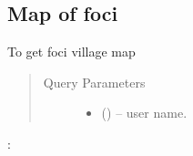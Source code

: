 \documentclass[letterpaper,10pt,english,openany,oneside]{sphinxmanual}
\begin{document}
\subsection{Map of foci}
\label{\detokenize{api-cmi/v1:map-of-foci}}

\begin{fulllineitems}
\label{\detokenize{api-cmi/v1:post--api-malaria-info-v1-Foci-list}}
\sphinxAtStartPar
To get foci village map
\begin{quote}\begin{description}
\item[{Query Parameters}] \leavevmode\begin{itemize}
\item {} 
\sphinxAtStartPar
{} () – user name.

\end{itemize}

\end{description}\end{quote}

\sphinxAtStartPar
{}:


\end{fulllineitems}
\end{document}

